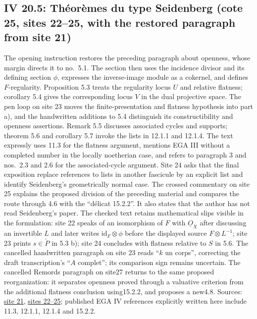 \subsection*{IV 20.5: Théorèmes du type Seidenberg (cote 25, sites 22--25, with the restored paragraph from site 21)}
The opening instruction restores the preceding paragraph about openness, whose margin directs it to no.\ 5.1. The section then uses the incidence divisor and its defining section $\phi$, expresses the inverse-image module as a cokernel, and defines $F$-regularity. Proposition 5.3 treats the regularity locus $U$ and relative flatness; corollary 5.4 gives the corresponding locus $V$ in the dual projective space. The pen loop on site 23 moves the finite-presentation and flatness hypothesis into part a), and the handwritten additions to 5.4 distinguish its constructibility and openness assertions. Remark 5.5 discusses associated cycles and supports; theorem 5.6 and corollary 5.7 invoke the lists in 12.1.1 and 12.1.4. The text expressly uses 11.3 for the flatness argument, mentions EGA III without a completed number in the locally noetherian case, and refers to paragraph 3 and nos.\ 2.3 and 2.6 for the associated-cycle argument. Site 24 asks that the final exposition replace references to lists in another fascicule by an explicit list and identify Seidenberg's geometrically normal case. The crossed commentary on site 25 explains the proposed division of the preceding material and compares the route through 4.6 with the ``délicat 15.2.2''. It also states that the author has not read Seidenberg's paper. The checked text retains mathematical slips visible in the formulation: site 22 speaks of an isomorphism of $F$ with $\underline{O}_X$ after discussing an invertible $L$ and later writes $\mathrm{id}_F\otimes\phi$ before the displayed source $F\otimes L^{-1}$; site 23 prints $s\in\check P$ in 5.3 b); site 24 concludes with flatness relative to $S$ in 5.6. The cancelled handwritten paragraph on site 23 reads ``$k$ un corps'', correcting the draft transcription's ``$A$ complet''; its comparison sign remains uncertain. The cancelled Remords paragraph on site27 returns to the same proposed reorganization: it separates openness proved through a valuative criterion from the additional flatness conclusion using15.2.2, and proposes a new4.8. Sources: \href{https://grothendieck.umontpellier.fr/web/viewer.html?file=../25.pdf\#page=22}{site 21}, \href{https://grothendieck.umontpellier.fr/web/viewer.html?file=../25.pdf\#page=23}{sites 22--25}; published EGA IV references explicitly written here include 11.3, 12.1.1, 12.1.4 and 15.2.2.
